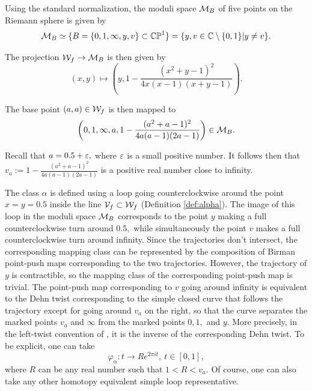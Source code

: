\documentclass{article}
\begin{document}
Using the standard normalization, the moduli space $\mathcal{M}_B$ of five points on the Riemann sphere is given by
$$
\mathcal{M}_B\simeq \{B=\{0,1,\infty,y,v\}\subset \mathbb{CP}^1\}=\{y,v\in \mathbb{C}\setminus \{0,1\}|y\neq v\}.
$$

The projection $\mathcal{W}_f\to \mathcal{M}_B$ is then given by 
$$
(x,y)\mapsto \left(y,1-\frac{(x^2+y-1)^2}{4x(x-1)(x+y-1)}\right).
$$

The base point $(a,a)\in\mathcal{W}_f$ is then mapped to 
$$
\left(0,1,\infty,a,1-\frac{(a^2+a-1)^2}{4a(a-1)(2a-1)}\right)\in \mathcal{M}_B.
$$

Recall that $a=0.5+\varepsilon,$ where $\varepsilon$ is a small positive number. It follows then that $v_a:=1-\frac{(a^2+a-1)^2}{4a(a-1)(2a-1)}$ is a positive real number close to infinity.

The class $\alpha$ is defined using a loop going counterclockwise around the point $x=y=0.5$ inside the line $\mathcal{V}_f\subset\mathcal{W}_f$ (Definition \ref{def:alpha}). The image of this loop in the moduli space $\mathcal{M}_B$ corresponds to the point $y$ making a full counterclockwise turn around $0.5,$ while simultaneously the point $v$ makes a full counterclockwise turn around infinity. Since the trajectories don't intersect, the corresponding mapping class can be represented by the composition of Birman point-push maps corresponding to the two trajectories. However, the trajectory of $y$ is contractible, so the mapping class of the corresponding point-push map is trivial. The point-push map corresponding to $v$ going around infinity is equivalent to the Dehn twist corresponding to the simple closed curve that follows the trajectory except for going around $v_a$ on the right, so that the curve separates the marked points $v_a$ and $\infty$ from the marked points $0,1,$ and $y.$ More precisely, in the left-twist convention of \cite{FM}, it is the inverse of the corresponding Dehn twist. To be explicit, one can take
$$
\varphi_\alpha: t\to Re^{2\pi i t},\ t\in[0,1],
$$
where $R$ can be any real number such that $1<R<v_a.$ Of course, one can also take any other homotopy equivalent simple loop representative.
\end{document}
